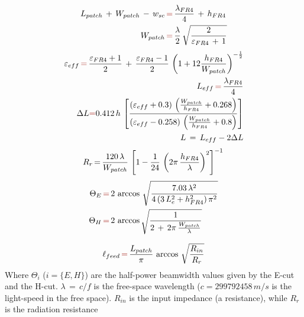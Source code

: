 \documentclass[12pt,a4paper]{article}
\begin{document}
{	\begin{equation}
		\begin{aligned}L_{patch}\,+\,W_{patch}\,-\,w_{sc}\,&{\color{Mahogany}=}\,\frac{\lambda_{FR4}}{4}\,+\,h_{FR4}\\
			W_{patch}\,&{\color{Mahogany}=}\,\frac{\lambda}{2}\,\sqrt{\frac{2}{\varepsilon_{FR4}\,+\,1}}\\
		\end{aligned}
	\end{equation}
	\begin{equation}
		\begin{aligned}
			\varepsilon_{eff}\,{\color{Mahogany}=}\,\frac{\varepsilon_{FR4}+1}{2}\,+\,\frac{\varepsilon_{FR4}-1}{2}\,\left(1+12\frac{h_{FR4}}{W_{patch}}\right)^{-\frac{1}{2}}\\
			L_{eff}\,{\color{Mahogany}=}\,\frac{\lambda_{FR4}}{4}\\
			\Delta L{\color{Mahogany}=}0.412\,h\,\left[\frac{(\varepsilon_{eff}+0.3)\,\left(\frac{W_{patch}}{h_{FR4}}+0.268\right)}{(\varepsilon_{eff}-0.258)\,\left(\frac{W_{patch}}{h_{FR4}}+0.8\right)}\right]\\
			L\,=\,L_{eff}-2\Delta L
		\end{aligned}
	\end{equation}
	\begin{equation}
		R_r\,{=}\,\frac{120\,\lambda}{W_{patch}}\,\left[1-\frac{1}{24}\,\left(2\pi\,\frac{h_{FR4}}{\lambda}\right)^{2}\right]^{-1}\\
	\end{equation}
	\begin{equation}
		\begin{aligned}
			\Theta_E\,&{\color{Mahogany}=}\,2\,\arccos\,\sqrt{\frac{7.03\,\lambda^2}{4\,(3\,L_e^2+h_{FR4}^2)\,\pi^2}}\\
			\Theta_H\,&{\color{Mahogany}=}\,2\,\arccos\sqrt{\frac{1}{2\,+\,2\pi\,\frac{W_{patch}}{\lambda}}}\\
		\end{aligned}
	\end{equation}
	
	\begin{equation}
		\ell_{feed}\,{\color{Mahogany}=}\,\frac{L_{patch}}{\pi}\,\arccos\,\sqrt{\frac{R_{in}}{R_r}}
	\end{equation}
	Where $\Theta_i$ ($i=\{E,H\}$) are the half-power beamwidth values given by the E-cut and the H-cut. $\lambda\,=\,c/f$ is the free-space wavelength ($c=299 792 458\,m/s$ is the light-speed in the free space). $R_{in}$ is the input impedance (a resistance), while $R_r$ is the radiation resistance
}
\end{document}
